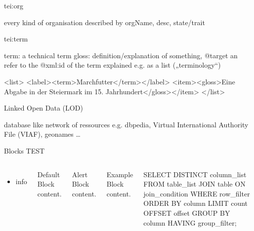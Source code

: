 tei:org

every kind of organisation
described by orgName, desc, state/trait

tei:term

term: a technical term
gloss: definition/explanation of something, @target  an refer to the @xml:id of the term explained
e.g. as a list („terminology“)
\begin{xmlcode}
<list>
  <label><term>Marchfutter</term></label>
  <item><gloss>Eine Abgabe in der Steiermark im 15. Jahrhundert</gloss></item>
</list>
\end{xmlcode}

Linked Open Data (LOD)

database like network of ressources
e.g. dbpedia, Virtual International Authority File (VIAF), geonames \dots

\begin{frame}[fragile]{Blocks}
TEST
  \begin{columns}[T,onlytextwidth]
      \begin{itemize}
          \item info
      \end{itemize}
      
      \begin{block}{Default}
        Block content.
      \end{block}

      \begin{alertblock}{Alert}
        Block content.
      \end{alertblock}

      \begin{exampleblock}{Example}
        Block content.
      \end{exampleblock}

      \begin{greysql}
SELECT DISTINCT column_list
FROM table_list
    JOIN table ON join_condition
WHERE row_filter
ORDER BY column
LIMIT count OFFSET offset
GROUP BY column
HAVING group_filter;
\end{greysql}

  \end{columns}
\end{frame}


